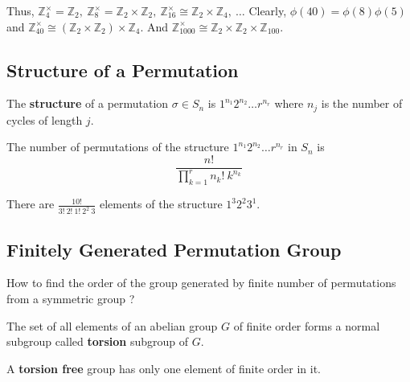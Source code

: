 \begin{enumerate}
		Thus, $\mathbb{Z}_4^\times = \mathbb{Z}_2,\ \mathbb{Z}_8^\times = \mathbb{Z}_2 \times \mathbb{Z}_2,\ \mathbb{Z}_{16}^\times \cong \mathbb{Z}_2 \times \mathbb{Z}_4,\ \dots$
		Clearly, $\phi(40) = \phi(8)\phi(5)$ and $\mathbb{Z}_{40}^\times \cong (\mathbb{Z}_2 \times \mathbb{Z}_2) \times \mathbb{Z}_4$.
		And $\mathbb{Z}_{1000}^\times \cong \mathbb{Z}_2 \times \mathbb{Z}_2 \times \mathbb{Z}_{100}$.
\end{enumerate}

\subsection{Structure of a Permutation}
\begin{definition}
	The \textbf{structure} of a permutation $\sigma \in S_n$ is $1^{n_1} 2^{n_2} \dots r^{n_r}$ where $n_j$ is the number of cycles of length $j$.
\end{definition}
	The number of permutations of the structure $1^{n_1} 2^{n_2} \dots r^{n_r}$ in $S_n$ is
	$$ \frac{n!}{\prod_{k=1}^r n_k!\ k^{n_k}}$$

	There are $\frac{10!}{3!\ 2!\ 1!\ 2^2\ 3}$ elements of the structure $1^3 2^2 3^1$.


\subsection{Finitely Generated Permutation Group}
How to find the order of the group generated by finite number of permutations from a symmetric group ?
\begin{definition}
	The set of all elements of an abelian group $G$ of finite order forms a normal subgroup called \textbf{torsion} subgroup of $G$.
\end{definition}

\begin{definition}
	A \textbf{torsion free} group has only one element of finite order in it.
\end{definition}

